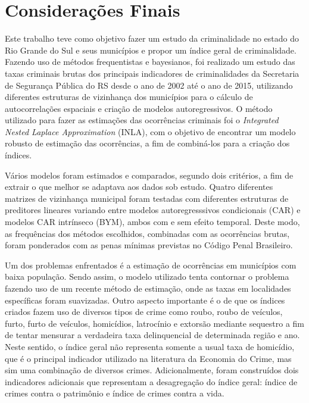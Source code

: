 \documentclass[12pt,openright,oneside,a4paper,english,french,spanish]{abntex2}
\numberwithin{table}{section} %
\numberwithin{figure}{section} %
\begin{document}
\section{Considerações Finais\label{sec:cons_finais_ICrime}}


Este trabalho teve como objetivo fazer um estudo da criminalidade no estado do Rio Grande do Sul e seus municípios e propor um índice geral de criminalidade. Fazendo uso de métodos frequentistas e bayesianos, foi realizado um estudo das taxas criminais brutas dos principais indicadores de criminalidades da Secretaria de Segurança Pública do RS desde o ano de 2002 até o ano de 2015, utilizando diferentes estruturas de vizinhança dos municípios para o cálculo de autocorrelações espaciais e criação de modelos autoregressivos. O método utilizado para fazer as estimações das ocorrências criminais foi o \textit{Integrated Nested Laplace Approximation} (INLA), com o objetivo de encontrar um modelo robusto de estimação das ocorrências, a fim de combiná-los para a criação dos índices.

Vários modelos foram estimados e comparados, segundo dois critérios, a fim de extrair o que melhor se adaptava aos dados sob estudo. Quatro diferentes matrizes de vizinhança municipal foram testadas com diferentes estruturas de preditores lineares variando entre modelos autoregresssivos condicionais (CAR) e modelos CAR intrínseco (BYM), ambos com e sem efeito temporal. Deste modo, as frequências dos métodos escolhidos, combinadas com as ocorrências brutas, foram ponderados com as penas mínimas previstas no Código Penal Brasileiro.

Um dos problemas enfrentados é a estimação de ocorrências em municípios com baixa população. Sendo assim, o modelo utilizado tenta contornar o problema fazendo uso de um recente método de estimação, onde as taxas em localidades específicas foram suavizadas. Outro aspecto importante é o de que os índices criados fazem uso de diversos tipos de crime como roubo, roubo de veículos, furto, furto de veículos, homicídios, latrocínio e extorsão mediante sequestro a fim de tentar mensurar a verdadeira taxa delinquencial de determinada região e ano. Neste sentido, o índice geral não representa somente a usual taxa de homicídio, que é o principal indicador utilizado na literatura da Economia do Crime, mas sim uma combinação de diversos crimes. Adicionalmente, foram construídos dois indicadores adicionais que representam a desagregação do índice geral: índice de crimes contra o patrimônio e índice de crimes contra a vida.
\end{document}
